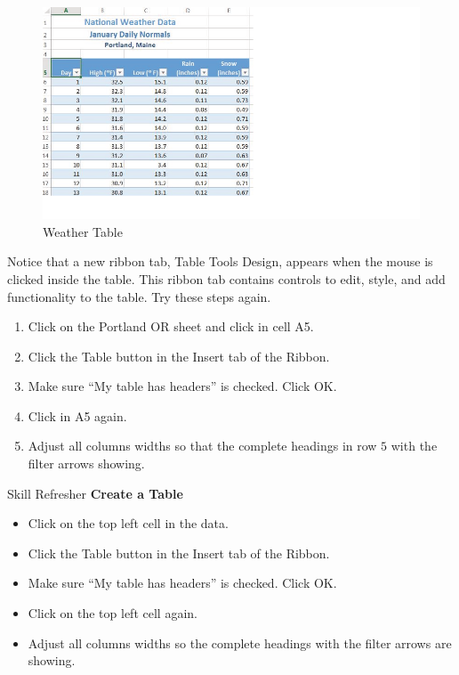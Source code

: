 \begin{figure}[H]
	\centering
	\includegraphics[width=\maxwidth{.95\linewidth}]{gfx/ch05_fig03}
	\caption{Weather Table}
	\label{05:fig03}
\end{figure}

Notice that a new ribbon tab, Table Tools Design, appears when the mouse is clicked inside the table. This ribbon tab contains controls to edit, style, and add functionality to the table. Try these steps again.

\begin{enumerate}
	\item Click on the Portland OR sheet and click in cell \textsf{A5}.
	\item Click the Table button in the Insert tab of the Ribbon.
	\item Make sure ``My table has headers'' is checked. Click OK.
	\item Click in \textsf{A5} again.
	\item Adjust all columns widths so that the complete headings in row $ 5 $ with the filter arrows showing.
\end{enumerate}

\begin{center}
	\begin{sklbox}{Skill Refresher}
		\textbf{Create a Table}
		\\
		\begin{itemize}
			\setlength{\itemsep}{0pt}
			\setlength{\parskip}{0pt}
			\setlength{\parsep}{0pt}

			\item Click on the top left cell in the data.
			\item Click the Table button in the Insert tab of the Ribbon.
			\item Make sure ``My table has headers'' is checked. Click OK.
			\item Click on the top left cell again.
			\item Adjust all columns widths so the complete headings with the filter arrows are showing.
						
		\end{itemize}
	\end{sklbox}
\end{center}

